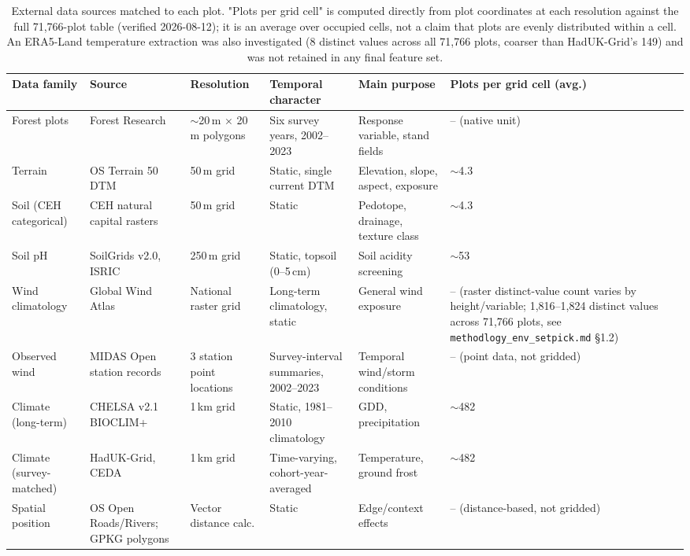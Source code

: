 \begin{table}[!htbp]
\centering
\scriptsize
\setlength{\tabcolsep}{3pt}
\renewcommand{\arraystretch}{0.95}
\begin{tabular}{p{1.6cm}p{2.3cm}p{2.6cm}p{2.4cm}p{2.7cm}p{2.4cm}}
\hline
Data family & Source & Resolution & Temporal character & Main purpose & Plots per grid cell (avg.) \\
\hline
Forest plots & Forest Research & $\sim$20\,m $\times$ 20\,m polygons & Six survey years, 2002--2023 & Response variable, stand fields & -- (native unit) \\
Terrain & OS Terrain 50 DTM \ct{OS Terrain 50, Ordnance Survey -- exact edition/vintage not found in code, see \S\ref{sec:data-source}} & 50\,m grid & Static, single current DTM & Elevation, slope, aspect, exposure & $\sim$4.3 \\
Soil (CEH categorical) & CEH natural capital rasters \ct{CEH natural capital rasters, UKCEH} & 50\,m grid & Static & Pedotope, drainage, texture class & $\sim$4.3 \\
Soil pH & SoilGrids v2.0, ISRIC \ct{SoilGrids v2.0, ISRIC} & 250\,m grid & Static, topsoil (0--5\,cm) & Soil acidity screening & $\sim$53 \\
Wind climatology & Global Wind Atlas \ct{Global Wind Atlas} & National raster grid & Long-term climatology, static & General wind exposure & -- (raster distinct-value count varies by height/variable; 1,816--1,824 distinct values across 71,766 plots, see \texttt{methodlogy\_env\_setpick.md} \S1.2) \\
Observed wind & MIDAS Open station records \ct{MIDAS Open, Met Office} & 3 station point locations & Survey-interval summaries, 2002--2023 & Temporal wind/storm conditions & -- (point data, not gridded) \\
Climate (long-term) & CHELSA v2.1 BIOCLIM+ \ct{CHELSA v2.1} & 1\,km grid & Static, 1981--2010 climatology & GDD, precipitation & $\sim$482 \\
Climate (survey-matched) & HadUK-Grid, CEDA \ct{HadUK-Grid, CEDA/Met Office} & 1\,km grid & Time-varying, cohort-year-averaged & Temperature, ground frost & $\sim$482 \\
Spatial position & OS Open Roads/Rivers; GPKG polygons \ct{OS Open Roads, OS Open Rivers, Ordnance Survey} & Vector distance calc. & Static & Edge/context effects & -- (distance-based, not gridded) \\
\hline
\end{tabular}
\caption{External data sources matched to each plot. "Plots per grid cell" is computed directly
from plot coordinates at each resolution against the full 71,766-plot table (verified 2026-08-12);
it is an average over occupied cells, not a claim that plots are evenly distributed within a cell.
An ERA5-Land temperature extraction was also investigated (8 distinct values across all 71,766
plots, coarser than HadUK-Grid's 149) and was not retained in any final feature set.}
\label{tab:data-env-sources}
\end{table}


